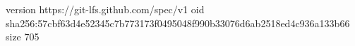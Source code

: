version https://git-lfs.github.com/spec/v1
oid sha256:57cbf63d4e52345c7b773173f0495048f990b33076d6ab2518ed4c936a133b66
size 705
